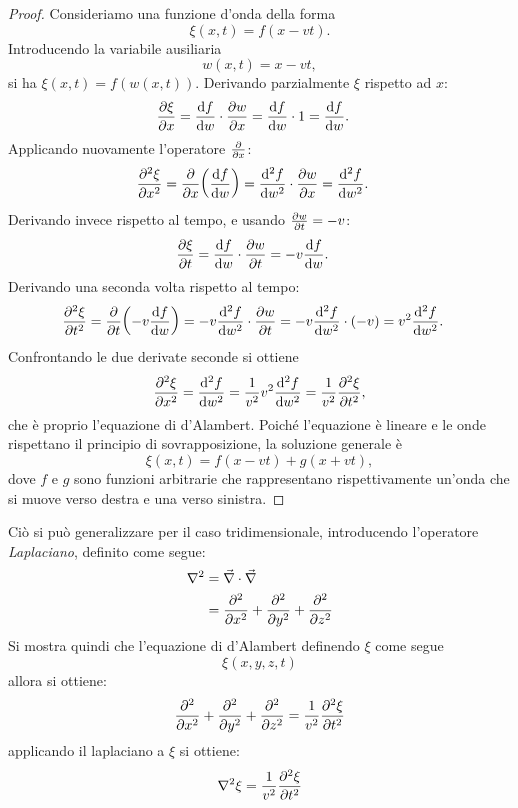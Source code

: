 \documentclass[11pt, a4paper, openright]{book}
\theoremstyle{plain}
\theoremstyle{definition}
\begin{document}
\begin{proof}
Consideriamo una funzione d'onda della forma
\begin{equation}
    \xi(x, t) = f(x - vt).
\end{equation}
Introducendo la variabile ausiliaria
\begin{equation}
    w(x, t) = x - vt,
\end{equation}
si ha $\xi(x, t) = f(w(x, t))$. Derivando parzialmente $\xi$ rispetto ad $x$:
\begin{align}
    \pdv{\xi}{x} &= \dv{f}{w} \cdot \pdv{w}{x}
                  = \dv{f}{w} \cdot 1
                  = \dv{f}{w}.
\end{align}
Applicando nuovamente l'operatore $\pdv{}{x}$:
\begin{align}
    \pdv[2]{\xi}{x}
        &= \pdv{x}\!\left(\dv{f}{w}\right)
         = \dv[2]{f}{w} \cdot \pdv{w}{x}
         = \dv[2]{f}{w}.
\end{align}
Derivando invece rispetto al tempo, e usando $\pdv{w}{t} = -v$:
\begin{align}
    \pdv{\xi}{t}
        &= \dv{f}{w} \cdot \pdv{w}{t}
         = -v\dv{f}{w}.
\end{align}
Derivando una seconda volta rispetto al tempo:
\begin{align}
    \pdv[2]{\xi}{t}
        &= \pdv{t}\!\left(-v\dv{f}{w}\right)
         = -v\dv[2]{f}{w} \cdot \pdv{w}{t}
         = -v\dv[2]{f}{w} \cdot (-v)
         = v^2\dv[2]{f}{w}.
\end{align}
Confrontando le due derivate seconde si ottiene
\begin{equation}
    \pdv[2]{\xi}{x} = \dv[2]{f}{w} = \frac{1}{v^2}v^2\dv[2]{f}{w}
    = \frac{1}{v^2}\pdv[2]{\xi}{t},
\end{equation}
che è proprio l'equazione di d'Alambert. Poiché l'equazione è lineare e le
onde rispettano il principio di sovrapposizione, la soluzione generale è
\begin{equation}
    \xi(x, t) = f(x - vt) + g(x + vt),
\end{equation}
dove $f$ e $g$ sono funzioni arbitrarie che rappresentano rispettivamente
un'onda che si muove verso destra e una verso sinistra.
\end{proof}

Ciò si può generalizzare per il caso tridimensionale, introducendo l'operatore \textit{Laplaciano}, definito come segue:
\begin{align}
    \nabla^2 & = \vec{\nabla} \cdot \vec{\nabla} \\
             & = \pdv[2]{}{x} + \pdv[2]{}{y} + \pdv[2]{}{z} 
\end{align}
Si mostra quindi che l'equazione di d'Alambert definendo $\xi$ come segue
\begin{equation}
    \xi(x, y, z, t)
\end{equation}
allora si ottiene:
\begin{equation}
    \pdv[2]{}{x} + \pdv[2]{}{y} + \pdv[2]{}{z} = \frac{1}{v^2} \pdv[2]{\xi}{t}
\end{equation}
applicando il laplaciano a $\xi$ si ottiene:
\begin{equation}
    \nabla^2 \xi = \frac{1}{v^2} \pdv[2]{\xi}{t}
\end{equation} 
\end{document}
